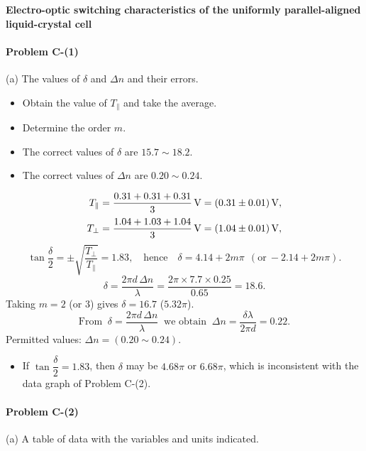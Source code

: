 \noindent\textbf{Electro-optic switching characteristics of the uniformly parallel-aligned
liquid-crystal cell}

\paragraph{Problem C-(1)}

(a) The values of $\delta$ and $\Delta n$ and their errors.

\begin{itemize}
\item Obtain the value of $T_{\parallel}$ and take the average.
\item Determine the order $m$.
\item The correct values of $\delta$ are $15.7\sim18.2$.
\item The correct values of $\Delta n$ are $0.20\sim0.24$.
\end{itemize}

\begin{align*}
T_{\parallel}&=\frac{0.31+0.31+0.31}{3}\,\mathrm{V}=(0.31\pm0.01)\,\mathrm{V},\\[2pt]
T_{\perp}&=\frac{1.04+1.03+1.04}{3}\,\mathrm{V}=(1.04\pm0.01)\,\mathrm{V},
\end{align*}
\[
\tan\frac{\delta}{2}=\pm\sqrt{\frac{T_{\perp}}{T_{\parallel}}}=1.83,
\quad\text{hence}\quad
\delta=4.14+2m\pi\ \ (\text{or}\ -2.14+2m\pi).
\]
\[
\delta=\frac{2\pi d\,\Delta n}{\lambda}=\frac{2\pi\times7.7\times0.25}{0.65}=18.6 .
\]
Taking $m=2$ (or $3$) gives $\delta=16.7$ ($5.32\pi$).
\[
\text{From }\ \delta=\frac{2\pi d\,\Delta n}{\lambda}\ \text{ we obtain }\
\Delta n=\frac{\delta\lambda}{2\pi d}=0.22 .
\]
Permitted values: $\Delta n=(0.20\sim0.24)$.

\begin{itemize}
\item If $\tan\dfrac{\delta}{2}=1.83$, then $\delta$ may be $4.68\pi$ or $6.68\pi$, which is
inconsistent with the data graph of Problem C-(2).
\end{itemize}

\paragraph{Problem C-(2)}

(a) A table of data with the variables and units indicated.

